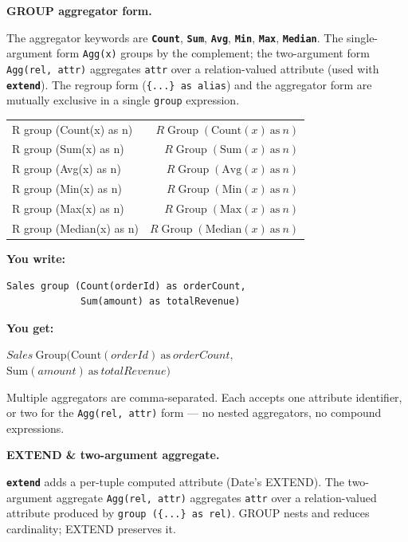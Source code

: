 \documentclass[10pt,landscape,a4paper]{article}
\newcommand{\kw}[1]{\texttt{\bfseries #1}}
\newenvironment{exwrite}%
  {\par\nobreak\noindent\scriptsize\textbf{You write:}\par\nobreak\vspace{0pt}\scriptsize}%
  {\vspace{1pt}\nobreak}
\newenvironment{exget}%
  {\par\nobreak\noindent\scriptsize\textbf{You get:}\par\nobreak\vspace{0pt}\small}%
  {\par\vspace{3pt}}
\begin{document}
\begin{multicols}{2}
\smallskip
\textbf{GROUP aggregator form.}

{\scriptsize The aggregator keywords are \kw{Count}, \kw{Sum}, \kw{Avg}, \kw{Min}, \kw{Max}, \kw{Median}. The single-argument form \texttt{Agg(x)} groups by the complement; the two-argument form \texttt{Agg(rel, attr)} aggregates \texttt{attr} over a relation-valued attribute (used with \kw{extend}). The regroup form (\texttt{\{...\} as alias}) and the aggregator form are mutually exclusive in a single \texttt{group} expression.}

\begin{tabularx}{\columnwidth}{LR}
R group (Count(x) as n)   & $R \mathop{\mathrm{Group}}(\mathrm{Count}(x)~\mathrm{as}~n)$ \\
R group (Sum(x) as n)     & $R \mathop{\mathrm{Group}}(\mathrm{Sum}(x)~\mathrm{as}~n)$ \\
R group (Avg(x) as n)     & $R \mathop{\mathrm{Group}}(\mathrm{Avg}(x)~\mathrm{as}~n)$ \\
R group (Min(x) as n)     & $R \mathop{\mathrm{Group}}(\mathrm{Min}(x)~\mathrm{as}~n)$ \\
R group (Max(x) as n)     & $R \mathop{\mathrm{Group}}(\mathrm{Max}(x)~\mathrm{as}~n)$ \\
R group (Median(x) as n)  & $R \mathop{\mathrm{Group}}(\mathrm{Median}(x)~\mathrm{as}~n)$ \\
\end{tabularx}

\begin{exwrite}
\begin{verbatim}
Sales group (Count(orderId) as orderCount,
             Sum(amount) as totalRevenue)
\end{verbatim}
\end{exwrite}
\begin{exget}
\begin{center}
$Sales~\mathrm{Group}(\mathrm{Count}(orderId)~\mathrm{as}~orderCount,$\\
$\mathrm{Sum}(amount)~\mathrm{as}~totalRevenue)$
\end{center}
\end{exget}

{\scriptsize Multiple aggregators are comma-separated. Each accepts one attribute identifier, or two for the \texttt{Agg(rel, attr)} form — no nested aggregators, no compound expressions.}

\smallskip
{}
\textbf{EXTEND \& two-argument aggregate.}

{\scriptsize \kw{extend} adds a per-tuple computed attribute (Date's EXTEND). The two-argument aggregate \texttt{Agg(rel, attr)} aggregates \texttt{attr} over a relation-valued attribute produced by \texttt{group (\{...\} as rel)}. GROUP nests and reduces cardinality; EXTEND preserves it.}


\end{multicols}
\end{document}

